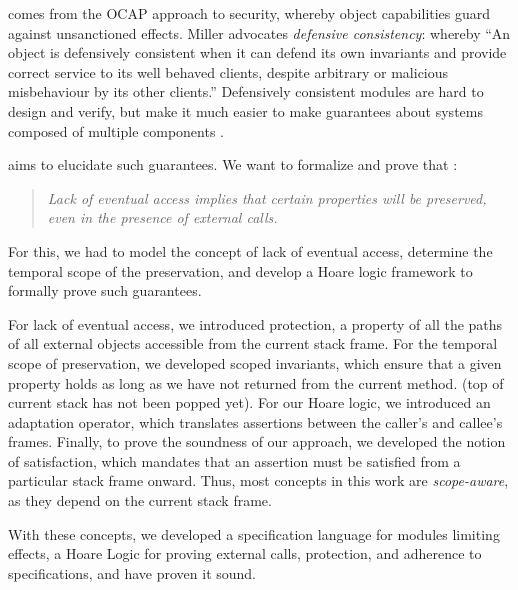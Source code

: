 comes from the OCAP approach to security, whereby object capabilities guard against unsanctioned effects.
Miller \cite{miller-esop2013,MillerPhD} advocates
 \emph{defensive consistency}: whereby %
 {``An object is defensively
  consistent when it can defend its own invariants and provide correct
  service to its well behaved clients, despite arbitrary or malicious
  misbehaviour by its other clients.''}  Defensively consistent
modules  are  hard to design %
 and  verify, but
make it much
easier to make guarantees about systems composed of multiple components
\cite{Murray10dphil}.

  aims to elucidate such guarantees. We want to formalize and prove  that 
\cite{permissionAuthority}:
\begin{quote}
\emph{Lack of eventual access implies that certain properties will be preserved, even in the presence of external calls.}
\end{quote}
For this, we had  to  model the concept of  lack of eventual access,  determine the temporal scope of the preservation, and  develop a Hoare logic framework to formally prove such guarantees.

For lack of eventual access,  we introduced protection, %
a property of all  the paths of all external objects accessible from the current stack frame.
For the  temporal scope of preservation, we developed scoped invariants, which ensure that a given property holds as long as we have not returned from the current method.
  (top of current stack has not been popped yet). 
 For our Hoare logic, we introduced an adaptation operator, which translates assertions between the caller’s and callee’s frames. 
 Finally, to prove the soundness of our approach, we developed the notion of \strong satisfaction,  which mandates that an assertion must be satisfied from a particular stack frame onward. 
 Thus, most concepts in this work are  \emph{scope-aware}, as they depend  on the current stack frame.
 
 With these concepts, we %
 developed a specification language for modules limiting effects, a Hoare Logic for proving external calls, protection, and adherence to specifications, and have proven it sound. %

